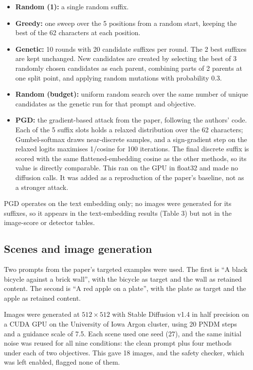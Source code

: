 \documentclass[11pt]{article}
\begin{document}
\begin{itemize}
\item \textbf{Random (1):} a single random suffix.
\item \textbf{Greedy:} one sweep over the 5 positions from a random start, keeping the best of the 62 characters at each position.
\item \textbf{Genetic:} 10 rounds with 20 candidate suffixes per round.
The 2 best suffixes are kept unchanged. New candidates are created
by selecting the best of 3 randomly chosen candidates as each parent, combining parts of 2 parents at one split point, and applying random mutations with probability 0.3.
\item \textbf{Random (budget):} uniform random search over the same number of unique candidates as the genetic run for that prompt and objective.
\item \textbf{PGD:} the gradient-based attack from the paper, following the authors' code. Each of the 5 suffix slots holds a relaxed distribution over the 62 characters; Gumbel-softmax draws near-discrete samples, and a sign-gradient step on the relaxed logits maximises 1/cosine for 100 iterations. The final discrete suffix is scored with the same flattened-embedding cosine as the other methods, so its value is directly comparable. This ran on the GPU in float32 and made no diffusion calls. It was added as a reproduction of the paper's baseline, not as a stronger attack.
\end{itemize}

PGD operates on the text embedding only; no images were generated for its suffixes, so it appears in the text-embedding results (Table 3) but not in the image-score or detector tables.

\subsection{Scenes and image generation}

Two prompts from the paper's targeted examples were used. The first is ``A black bicycle against a brick wall'', with the bicycle as target and the wall as retained content. The second is ``A red apple on a plate'', with the plate as target and the apple as retained content.

Images were generated at $512\times512$ with Stable Diffusion v1.4 in half precision on a CUDA GPU on the University of Iowa Argon cluster, using 20 PNDM steps and a guidance scale of 7.5. Each scene used one seed (27), and the same initial noise was reused for all nine conditions: the clean prompt plus four methods under each of two objectives. This gave 18 images, and the safety checker, which was left enabled, flagged none of them.
\end{document}
